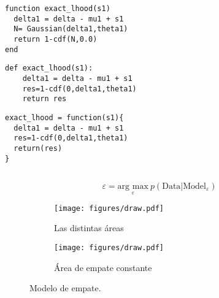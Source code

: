 \documentclass[article]{jss}
\newif\ifen
\newif\ifes
\newcommand{\en}[1]{\ifen#1\fi}
\newcommand{\es}[1]{\ifes#1\fi}
\begin{document}
%
\en{Y en la diferencia esperada $\delta$ remplazamos la media $\mu_1$ del prior por la hipótesis $s_1$.}
%
\begin{paracol}{3}
\begin{lstlisting}[backgroundcolor=\color{julia}]
function exact_lhood(s1)
  delta1 = delta - mu1 + s1 
  N= Gaussian(delta1,theta1)
  return 1-cdf(N,0.0)
end  
\end{lstlisting}  
 \switchcolumn
\begin{lstlisting}[backgroundcolor=\color{python}]
def exact_lhood(s1):
    delta1 = delta - mu1 + s1 
    res=1-cdf(0,delta1,theta1)
    return res

\end{lstlisting} 
 \switchcolumn
\begin{lstlisting}[backgroundcolor=\color{r}]
exact_lhood = function(s1){
  delta1 = delta - mu1 + s1 
  res=1-cdf(0,delta1,theta1)
  return(res)
}
\end{lstlisting}   
\end{paracol}

\subsection{\en{Draw model}} \label{sec:empate}

\en{El modelo inicial de empates propone que las victorias ocurren cuando la diferencia de rendimientos supera un cierto margen, $t_a > t_b + \varepsilon$, y que en caso contrario ocurre un empate $|t_a > t_b| \leq \varepsilon$.}
%
\en{En la figura~\ref{fig:draw_a} se pueden ver las áreas respectivas a cada uno de los posibles resultados de una partida.}
%
\en{El paper TrueSkill proponen determinar el valor del margen $\varepsilon$ en función de la ``frecuencia empírica de empates''.}
%
\en{Esta popuesta, sin embargo, tiene el problema de que la probabilidad de empates depende de la diferencia de habilidad, que justamente no conocemos.}
%
\en{Una alternativa es usar una estrategia clásica de optimización.}
%
\begin{equation*}
\varepsilon = \underset{\varepsilon}{\text{arg max}} \ p(\text{Data}|\text{Model}_{\varepsilon})
\end{equation*}
%
\en{Esto es, elegir el valor de $\varepsilon$ que maximiza la predicción a priori de los datos.}
%
\en{La estrategia de maximización de funciones de costo forman parte del marco frecuentista.}
%
\en{En la sección~\ref{sec:ttt-d} presentaremos una solución bayesiana al problema de los empates.}
%
\begin{figure}[t!]
\centering
\begin{subfigure}[t]{0.48\textwidth}
 \texttt{[image: figures/draw.pdf]} 
 \caption{Las distintas áreas}
 \label{fig:draw_a}
\end{subfigure}
\begin{subfigure}[t]{0.48\textwidth}
  \texttt{[image: figures/draw.pdf]}
  \caption{Área de empate constante}
 \label{fig:draw_b}
\end{subfigure}
  \caption{Modelo de empate.}
  \label{fig:draw}
\end{figure}
\end{document}
